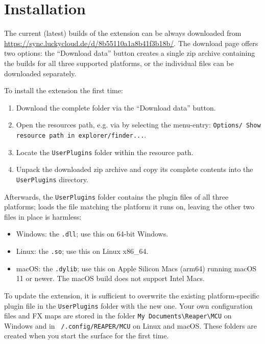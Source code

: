 \newpage
\section{Installation}\label{installation} 

The current (latest) builds of the extension can be always downloaded from
\url{https://sync.luckycloud.de/d/8b55110a1a8b41f3b18b/}. The download
page offers two options: the ``Download data'' button creates a single zip
archive containing the builds for all three supported platforms, or the
individual files can be downloaded separately.

To install the extension the first time:
\begin{enumerate}
\item Download the complete folder via the ``Download data'' button.
\item Open the \reaper resources path, e.g. via
\reaper by selecting the menu-entry: {\tt Options/ Show \reaper
  resource path in explorer/finder...}.
\item Locate the {\tt UserPlugins} folder within the \reaper resource path.
\item Unpack the downloaded zip archive and copy its complete
  contents into the {\tt UserPlugins} directory.
\end{enumerate}

Afterwards, the {\tt UserPlugins} folder contains the
plugin files of all three platforms; \reaper loads the file matching the
platform it runs on, leaving the other two files in place is harmless:
\begin{itemize}
\item Windows: the \texttt{.dll}; use this on 64-bit Windows.
\item Linux: the \texttt{.so}; use this on Linux x86\_64.
\item macOS: the \texttt{.dylib}; use this on Apple Silicon Macs (arm64)
  running macOS 11 or newer. The macOS build does not support Intel Macs.
\end{itemize}

To update the extension, it is sufficient to overwrite the existing
platform-specific plugin file in the {\tt UserPlugins} folder with the new
one. Your own configuration files
and FX maps are stored in the folder {\tt My Documents\textbackslash Reaper\textbackslash MCU}
on Windows and in {\tt ~/.config/REAPER/MCU} on Linux and macOS. These folders
are created when you start the \mcu surface for the first time.\\ 

